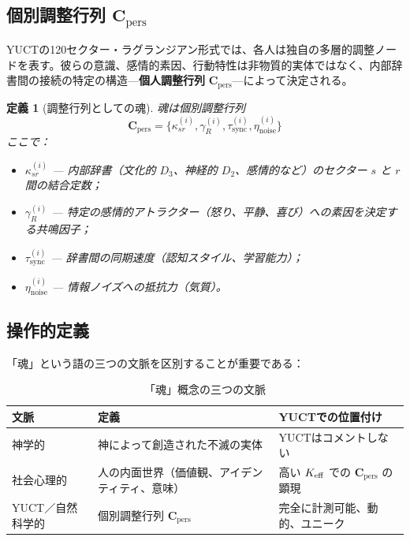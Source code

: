 \documentclass[11pt,a4paper]{article}
\newtheorem{definition}{定義}[section]
\newcommand{\Cpers}{\mathbf{C}_{\text{pers}}}
\begin{document}
	\subsection{個別調整行列 \(\Cpers\)}
	
	YUCTの120セクター・ラグランジアン形式では、各人は独自の多層的調整ノードを表す。彼らの意識、感情的素因、行動特性は非物質的実体ではなく、内部辞書間の接続の特定の構造—\textbf{個人調整行列} \(\Cpers\)—によって決定される。
	
	\begin{definition}[調整行列としての魂]
		魂は個別調整行列
		\[
		\Cpers = \{\kappa_{sr}^{(i)}, \gamma_R^{(i)}, \tau_{\text{sync}}^{(i)}, \eta_{\text{noise}}^{(i)}\}
		\]
		ここで：
		\begin{itemize}
			\item \(\kappa_{sr}^{(i)}\) — 内部辞書（文化的 \(D_3\)、神経的 \(D_2\)、感情的など）のセクター \(s\) と \(r\) 間の結合定数；
			\item \(\gamma_R^{(i)}\) — 特定の感情的アトラクター（怒り、平静、喜び）への素因を決定する共鳴因子；
			\item \(\tau_{\text{sync}}^{(i)}\) — 辞書間の同期速度（認知スタイル、学習能力）；
			\item \(\eta_{\text{noise}}^{(i)}\) — 情報ノイズへの抵抗力（気質）。
		\end{itemize}
	\end{definition}
	
	\subsection{操作的定義}
	
	「魂」という語の三つの文脈を区別することが重要である：
	
	\begin{table}[H]
		\centering
		\caption{「魂」概念の三つの文脈}
		\label{tab:soul-contexts}
		\begin{tabular}{p{3.5cm}p{5cm}p{5cm}}
			\toprule
			\textbf{文脈} & \textbf{定義} & \textbf{YUCTでの位置付け} \\
			\midrule
			神学的 & 神によって創造された不滅の実体 & YUCTはコメントしない \\
			社会心理的 & 人の内面世界（価値観、アイデンティティ、意味） & 高い \(\Keff\) での \(\Cpers\) の顕現 \\
			YUCT／自然科学的 & 個別調整行列 \(\Cpers\) & 完全に計測可能、動的、ユニーク \\
			\bottomrule
		\end{tabular}
	\end{table}
	
\end{document}
